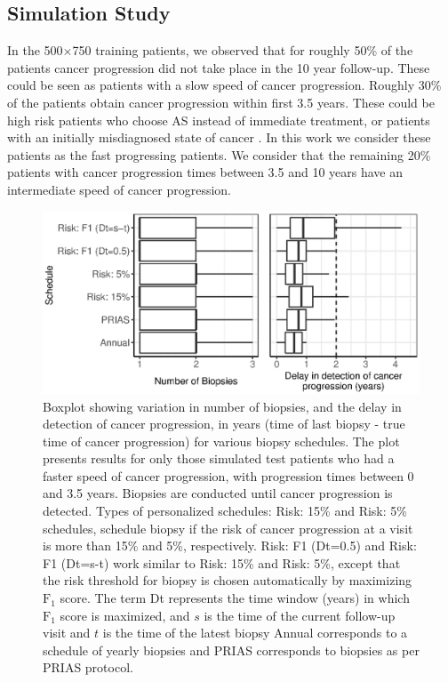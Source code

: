 \subsection{Simulation Study}
In the 500$\times$750 training patients, we observed that for roughly 50\% of the patients cancer progression did not take place in the 10 year follow-up. These could be seen as patients with a slow speed of cancer progression. Roughly 30\% of the patients obtain cancer progression within first 3.5 years. These could be high risk patients who choose AS instead of immediate treatment, or patients with an initially misdiagnosed state of cancer \cite{cooperberg2011outcomes}. In this work we consider these patients as the fast progressing patients. We consider that the remaining 20\% patients with cancer progression times between 3.5 and 10 years have an intermediate speed of cancer progression.
\begin{figure}[!htb]
\captionsetup{justification=justified}
\centerline{\includegraphics[width=\columnwidth]{images/sim_res_fast.eps}}
\caption{Boxplot showing variation in number of biopsies, and the delay in detection of cancer progression, in years (time of last biopsy - true time of cancer progression) for various biopsy schedules. The plot presents results for only those simulated test patients who had a faster speed of cancer progression, with progression times between 0 and 3.5 years. Biopsies are conducted until cancer progression is detected. Types of personalized schedules: Risk: 15\% and Risk: 5\% schedules, schedule biopsy if the risk of cancer progression at a visit is more than 15\% and 5\%, respectively. Risk: F1 (Dt=0.5) and Risk: F1 (Dt=s-t) work similar to Risk: 15\% and Risk: 5\%, except that the risk threshold for biopsy is chosen automatically by maximizing $\mbox{F}_1$ score. The term Dt represents the time window (years) in which $\mbox{F}_1$ score is maximized, and $s$ is the time of the current follow-up visit and $t$ is the time of the latest biopsy  Annual corresponds to a schedule of yearly biopsies and PRIAS corresponds to biopsies as per PRIAS protocol.}
\label{fig:sim_res_fast}
\end{figure}

